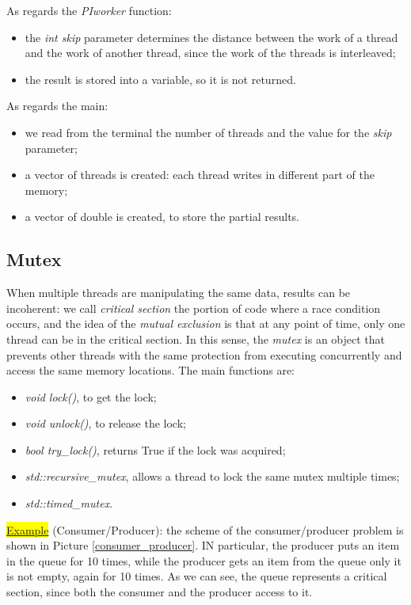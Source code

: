 As regards the \textit{PIworker} function:

\begin{itemize}
    \item the \textit{int skip} parameter determines the distance between the work of a thread and the work of another thread, since the work of the threads is interleaved;
    \item the result is stored into a variable, so it is not returned.
\end{itemize}

As regards the main:

\begin{itemize}
    \item we read from the terminal the number of threads and the value for the \textit{skip} parameter;
    \item a vector of threads is created: each thread writes in different part of the memory;
    \item a vector of double is created, to store the partial results.
\end{itemize}

\subsection{Mutex}
When multiple threads are manipulating the same data, results can be incoherent: we call \textit{critical section} the portion of code where a race condition occurs, and the idea of the \textit{mutual exclusion} is that at any point of time, only one thread can be in the critical section. In this sense, the \textit{mutex} is an object that prevents other threads with the same protection from executing concurrently and access the same memory locations. The main functions are:

\begin{itemize}
    \item \textit{void lock()}, to get the lock;
    \item \textit{void unlock()}, to release the lock;
    \item \textit{bool try\_lock()}, returns True if the lock was acquired;
    \item \textit{std::recursive\_mutex}, allows a thread to lock the same mutex multiple times;
    \item \textit{std::timed\_mutex}.
\end{itemize}

\colorbox{yellow}{\underline{Example}} (Consumer/Producer): the scheme of the consumer/producer problem is shown in Picture \ref{consumer_producer}. IN particular, the producer puts an item in the queue for 10 times, while the producer gets an item from the queue only it is not empty, again for 10 times. As we can see, the queue represents a critical section, since both the consumer and the producer access to it.

